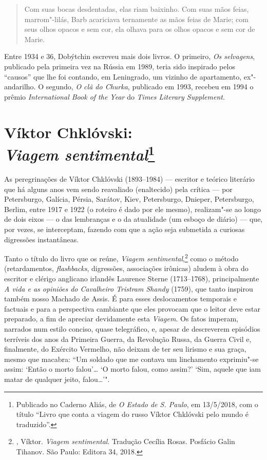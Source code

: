 \begin{quotation}
Com suas bocas desdentadas, elas riam baixinho. Com suas mãos feias,
marrom"-lilás, Barb acariciava ternamente as mãos feias de Marie; com
seus olhos opacos e sem cor, ela olhava para os olhos opacos e sem cor
de Marie.
\end{quotation}

Entre 1934 e 36, Dobýtchin escreveu mais dois livros. O primeiro,
\emph{Os selvagens}, publicado pela primeira vez na Rússia em 1989, teria sido inspirado pelos
``causos'' que lhe foi contando, em Leningrado, um vizinho de
apartamento, ex"-andarilho. O segundo, \emph{O clã do Churka}, publicado
em 1993, recebeu em 1994 o prêmio \emph{International Book of the Year}
do \emph{Times Literary Supplement}.

\chapter{Víktor Chklóvski:\\ \emph{Viagem sentimental}\footnote{Publicado no Caderno Aliás,
de \emph{O Estado de S. Paulo}, em 13/5/2018, com o título ``Livro que conta a viagem do russo Víktor Chklóvski pelo mundo é traduzido''.}}
\label{sentimental}

As peregrinações de Víktor Chklóvski (1893--1984) --- escritor e
teórico literário que há alguns anos vem sendo reavaliado
(enaltecido) pela crítica --- por Petersburgo, Galícia, Pérsia,
Sarátov, Kiev, Petersburgo, Dnieper, Petersburgo, Berlim, entre
1917 e 1922 (o roteiro é dado por ele mesmo), realizam"-se ao
longo de dois eixos --- o das lembranças e o da atualidade (um
esboço de diário) --- que, por vezes, se interceptam, fazendo com
que a ação seja submetida a curiosas digressões instantâneas.

Tanto o título do livro que os reúne, \emph{Viagem
sentimental},\footnote{, Víktor. \emph{Viagem
sentimental}. Tradução Cecília Rosas. Posfácio Galin Tihanov. São
Paulo: Editora 34, 2018.} como o método (retardamentos,
\emph{flashbacks}, digressões, associações irônicas) aludem à
obra do escritor e clérigo anglicano irlandês Laurence Sterne
(1713--1768), principalmente \emph{A vida e as opiniões do
Cavalheiro Tristram Shandy} (1759), que tanto inspirou também
nosso Machado de Assis. É para esses deslocamentos temporais e
factuais e para a perspectiva cambiante que eles provocam que o
leitor deve estar preparado, a fim de apreciar devidamente esta
\emph{Viagem}. Os fatos imperam, narrados num estilo conciso,
quase telegráfico, e, apesar de descreverem episódios terríveis
dos anos da Primeira Guerra, da Revolução Russa, da Guerra
Civil e, finalmente, do Exército Vermelho, não deixam de ter seu
lirismo e sua graça, mesmo que macabra: ``Um soldado que me
contava um linchamento exprimiu"-se assim: `Então o morto
falou'\ldots{} `O morto falou, como assim?' `Sim, aquele que iam
matar de qualquer jeito, falou\ldots{}'".


